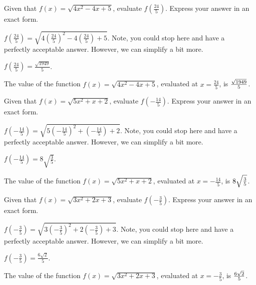 \begin{shuffle}
\begin{exercise}
Given that $f(x)=\sqrt{4 x^2-4 x+5}$, evaluate $f\left(\frac{24}{5}\right)$. Express your answer in an exact form.
\begin{solution}
\begin{hint}
$f\left(\frac{24}{5}\right)=\sqrt{4 (\frac{24}{5})^2-4 (\frac{24}{5})+5}$. Note, you could stop here and have a perfectly acceptable answer. However, we can simplify a bit more. 
\end{hint}
\begin{hint}
$f\left(\frac{24}{5}\right)=\frac{\sqrt{1949}}{5}$.
\end{hint}
The value of the function $f(x) = \sqrt{4 x^2-4 x+5}$, evaluated at $x=\frac{24}{5}$, is ${\frac{\sqrt{1949}}{5}}$.
\end{solution}
\end{exercise}

\begin{exercise}
Given that $f(x)=\sqrt{5 x^2+x+2}$, evaluate $f\left(-\frac{14}{5}\right)$. Express your answer in an exact form.
\begin{solution}
\begin{hint}
$f\left(-\frac{14}{5}\right)=\sqrt{5 (-\frac{14}{5})^2+(-\frac{14}{5})+2}$. Note, you could stop here and have a perfectly acceptable answer. However, we can simplify a bit more. 
\end{hint}
\begin{hint}
$f\left(-\frac{14}{5}\right)=8 \sqrt{\frac{3}{5}}$.
\end{hint}
The value of the function $f(x) = \sqrt{5 x^2+x+2}$, evaluated at $x=-\frac{14}{5}$, is ${8 \sqrt{\frac{3}{5}}}$.
\end{solution}
\end{exercise}

\begin{exercise}
Given that $f(x)=\sqrt{3 x^2+2 x+3}$, evaluate $f\left(-\frac{3}{5}\right)$. Express your answer in an exact form.
\begin{solution}
\begin{hint}
$f\left(-\frac{3}{5}\right)=\sqrt{3 (-\frac{3}{5})^2+2 (-\frac{3}{5})+3}$. Note, you could stop here and have a perfectly acceptable answer. However, we can simplify a bit more. 
\end{hint}
\begin{hint}
$f\left(-\frac{3}{5}\right)=\frac{6 \sqrt{2}}{5}$.
\end{hint}
The value of the function $f(x) = \sqrt{3 x^2+2 x+3}$, evaluated at $x=-\frac{3}{5}$, is ${\frac{6 \sqrt{2}}{5}}$.
\end{solution}
\end{exercise}


\end{shuffle}
